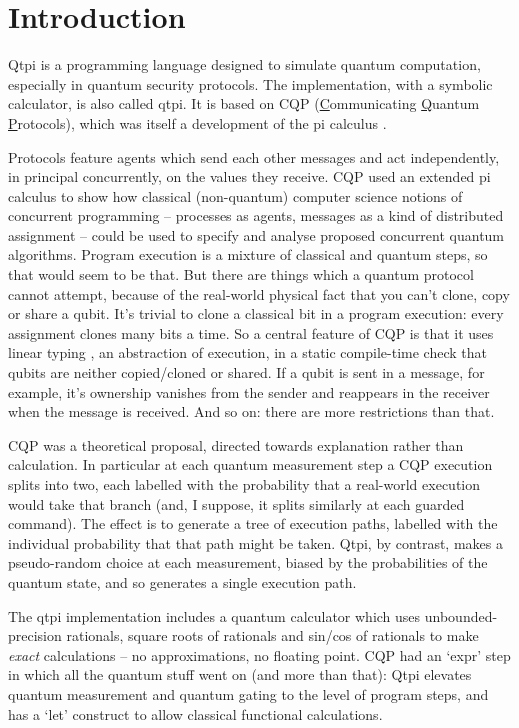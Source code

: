
\chapter{Introduction}

Qtpi is a programming language designed to simulate quantum computation, especially in quantum security protocols. The implementation, with a symbolic calculator, is also called qtpi. It is based on CQP \citep{GaySJ:comqp} (\underline{C}ommunicating \underline{Q}uantum \underline{P}rotocols), which was itself a development of the pi calculus \citep{DBLP:journals/iandc/MilnerPW92a}. 

Protocols feature agents which send each other messages and act independently, in principal concurrently, on the values they receive. CQP used an extended pi calculus to show how classical (non-quantum) computer science notions of concurrent programming -- processes as agents, messages as a kind of distributed assignment -- could be used to specify and analyse proposed concurrent quantum algorithms. Program execution is a mixture of classical and quantum steps, so that would seem to be that. But there are things which a quantum protocol cannot attempt, because of the real-world physical fact that you can't clone, copy or share a qubit. It's trivial to clone a classical bit in a program execution: every assignment clones many bits a time. So a central feature of CQP is that it uses linear typing \citep{kobayashi1999linearity}, an abstraction of execution, in a static compile-time check that qubits are neither copied/cloned or shared. If a qubit is sent in a message, for example, it's ownership vanishes from the sender and reappears in the receiver when the message is received. And so on: there are more restrictions than that.

CQP was a theoretical proposal, directed towards explanation rather than calculation. In particular at each quantum measurement step a CQP execution splits into two, each labelled with the probability that a real-world execution would take that branch (and, I suppose, it splits similarly at each guarded command). The effect is to generate a tree of execution paths, labelled with the individual probability that that path might be taken. Qtpi, by contrast, makes a pseudo-random choice at each measurement, biased by the probabilities of the quantum state, and so generates a single execution path. 

The qtpi implementation includes a quantum calculator which uses unbounded-precision rationals, square roots of rationals and sin/cos of rationals to make \emph{exact} calculations -- no approximations, no floating point. CQP had an `expr' step in which all the quantum stuff went on (and more than that): Qtpi elevates quantum measurement and quantum gating to the level of program steps, and has a `let' construct to allow classical functional calculations.

